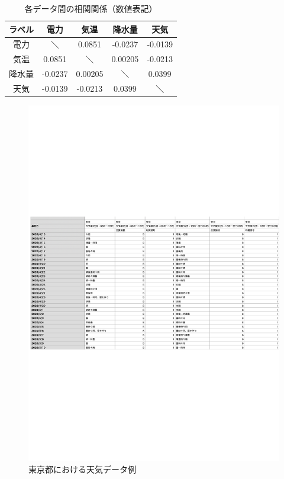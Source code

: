 \begin{table}[!t]
\centering
  \caption{各データ間の相関関係（数値表記）}
  \begin{tabular}{|c|c|c|c|c|} \hline
    ラベル & 電力 & 気温 & 降水量 & 天気 \\ \hline
    電力 & ＼ & 0.0851 & -0.0237 & -0.0139 \\ \hline
    気温 & 0.0851 & ＼ & 0.00205 & -0.0213 \\ \hline
    降水量 & -0.0237 & 0.00205 & ＼ & 0.0399 \\ \hline
    天気 & -0.0139 & -0.0213 & 0.0399 & ＼ \\ \hline
  \end{tabular}
\end{table}
\begin{figure}[phb]
\centering
\includegraphics[scale=0.8]{exe_wether.pdf}
\caption{東京都における天気データ例}
\end{figure}


